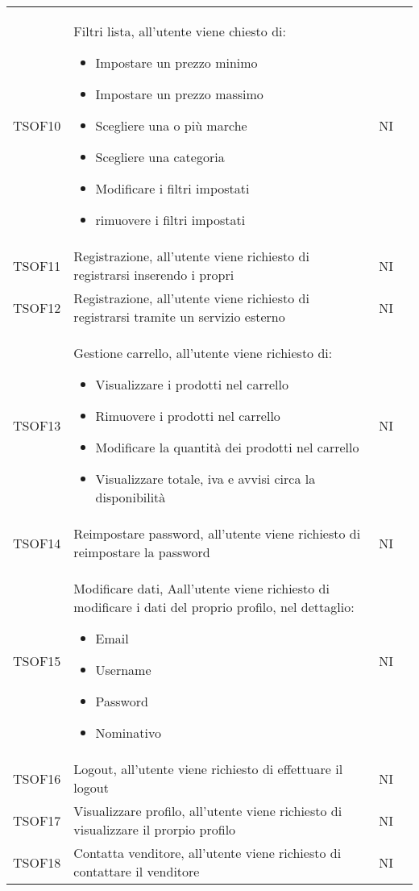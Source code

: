 \begin{center}
\begin{longtable}[!h]{p{50px} p{245px} p{75px} p{50px}}
        TSOF10  & Filtri lista, all'utente viene chiesto di: \begin{itemize} \item Impostare un prezzo minimo \item Impostare un prezzo massimo \item Scegliere una o pi\`u marche \item Scegliere una categoria \item Modificare i filtri impostati \item rimuovere i filtri impostati \end{itemize} & NI \\
        TSOF11  & Registrazione, all'utente viene richiesto di registrarsi inserendo i propri  & NI \\
        TSOF12  & Registrazione, all'utente viene richiesto di registrarsi tramite un servizio esterno & NI \\
        TSOF13  & Gestione carrello, all'utente viene richiesto di: \begin{itemize} \item Visualizzare i prodotti nel carrello \item Rimuovere i prodotti nel carrello \item Modificare la quantit\`a dei prodotti nel carrello \item Visualizzare totale, iva e avvisi circa la disponibilit\`a \end{itemize}  & NI \\
        TSOF14  & Reimpostare password, all'utente viene richiesto di reimpostare la password & NI \\
        TSOF15  & Modificare dati, Aall'utente viene richiesto di modificare i dati del proprio profilo, nel dettaglio: \begin{itemize} \item Email \item Username \item Password \item Nominativo \end{itemize} & NI \\
        TSOF16  & Logout, all'utente viene richiesto di effettuare il logout  & NI \\
        TSOF17  & Visualizzare profilo, all'utente viene richiesto di visualizzare il prorpio profilo & NI \\
        TSOF18  & Contatta venditore, all'utente viene richiesto di contattare il venditore & NI \\

\end{longtable}
\end{center}
